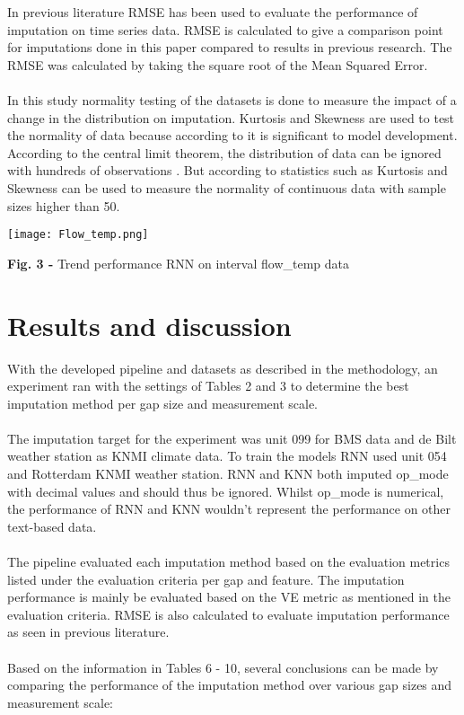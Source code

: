 \documentclass[9.5pt,article,twocolumn]{article}
\begin{document}
In previous literature \cite{Pazhoohesh,Cheng,Shapi} RMSE has been used to evaluate the performance of imputation on time series data. RMSE is calculated to give a comparison point for imputations done in this paper compared to results in previous research. The RMSE was calculated by taking the square root of the Mean Squared Error. 
\\
\\
In this study normality testing of the datasets is done to measure the impact of a change in the distribution on imputation. Kurtosis and Skewness are used to test the normality of data because according to \cite{Shapi} it is significant to model development. According to the central limit theorem, the distribution of data can be ignored with hundreds of observations \cite{Altman298}. But according to \cite{Mishra} statistics such as Kurtosis and Skewness can be used to measure the normality of continuous data with sample sizes higher than 50. 
\begin{figure*}[b]
    \texttt{[image: Flow\_temp.png]}
    \label{fig:my_label}
    \begin{flushleft}
    \begingroup
        \fontsize{9pt}{9pt}\selectfont
        \textbf{Fig. 3 -} Trend performance RNN on interval flow\_temp data
    \endgroup
    \vspace{-0.2cm}
    \end{flushleft}   
\end{figure*}
\vspace{-0.3cm}
\section{Results and discussion}
With the developed pipeline and datasets as described in the methodology, an experiment ran with the settings of Tables 2 and 3 to determine the best imputation method per gap size and measurement scale.
\\
\\
The imputation target for the experiment was unit 099 for BMS data and de Bilt weather station as KNMI climate data. To train the models RNN used unit 054 and Rotterdam KNMI weather station. RNN and KNN both imputed op\_mode with decimal values and should thus be ignored. Whilst op\_mode is numerical, the performance of RNN and KNN wouldn’t represent the performance on other text-based data.
\\
\\
The pipeline evaluated each imputation method based on the evaluation metrics listed under the evaluation criteria per gap and feature. The imputation performance is mainly be evaluated based on the VE metric as mentioned in the evaluation criteria. RMSE is also calculated to evaluate imputation performance as seen in previous literature.  
\\
\\
Based on the information in Tables 6 - 10, several conclusions can be made by comparing the performance of the imputation method over various gap sizes and measurement scale:
\end{document}
